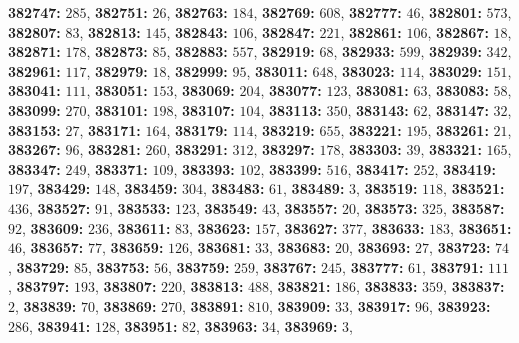 \textsf{\bfseries 382747:} $285$, \textsf{\bfseries 382751:} $26$, \textsf{\bfseries 382763:} $184$, \textsf{\bfseries 382769:} $608$, \textsf{\bfseries 382777:} $46$, \textsf{\bfseries 382801:} $573$, \textsf{\bfseries 382807:} $83$, \textsf{\bfseries 382813:} $145$, \textsf{\bfseries 382843:} $106$, \textsf{\bfseries 382847:} $221$, \textsf{\bfseries 382861:} $106$, \textsf{\bfseries 382867:} $18$, \textsf{\bfseries 382871:} $178$, \textsf{\bfseries 382873:} $85$, \textsf{\bfseries 382883:} $557$, \textsf{\bfseries 382919:} $68$, \textsf{\bfseries 382933:} $599$, \textsf{\bfseries 382939:} $342$, \textsf{\bfseries 382961:} $117$, \textsf{\bfseries 382979:} $18$, \textsf{\bfseries 382999:} $95$, \textsf{\bfseries 383011:} $648$, \textsf{\bfseries 383023:} $114$, \textsf{\bfseries 383029:} $151$, \textsf{\bfseries 383041:} $111$, \textsf{\bfseries 383051:} $153$, \textsf{\bfseries 383069:} $204$, \textsf{\bfseries 383077:} $123$, \textsf{\bfseries 383081:} $63$, \textsf{\bfseries 383083:} $58$, \textsf{\bfseries 383099:} $270$, \textsf{\bfseries 383101:} $198$, \textsf{\bfseries 383107:} $104$, \textsf{\bfseries 383113:} $350$, \textsf{\bfseries 383143:} $62$, \textsf{\bfseries 383147:} $32$, \textsf{\bfseries 383153:} $27$, \textsf{\bfseries 383171:} $164$, \textsf{\bfseries 383179:} $114$, \textsf{\bfseries 383219:} $655$, \textsf{\bfseries 383221:} $195$, \textsf{\bfseries 383261:} $21$, \textsf{\bfseries 383267:} $96$, \textsf{\bfseries 383281:} $260$, \textsf{\bfseries 383291:} $312$, \textsf{\bfseries 383297:} $178$, \textsf{\bfseries 383303:} $39$, \textsf{\bfseries 383321:} $165$, \textsf{\bfseries 383347:} $249$, \textsf{\bfseries 383371:} $109$, \textsf{\bfseries 383393:} $102$, \textsf{\bfseries 383399:} $516$, \textsf{\bfseries 383417:} $252$, \textsf{\bfseries 383419:} $197$, \textsf{\bfseries 383429:} $148$, \textsf{\bfseries 383459:} $304$, \textsf{\bfseries 383483:} $61$, \textsf{\bfseries 383489:} $3$, \textsf{\bfseries 383519:} $118$, \textsf{\bfseries 383521:} $436$, \textsf{\bfseries 383527:} $91$, \textsf{\bfseries 383533:} $123$, \textsf{\bfseries 383549:} $43$, \textsf{\bfseries 383557:} $20$, \textsf{\bfseries 383573:} $325$, \textsf{\bfseries 383587:} $92$, \textsf{\bfseries 383609:} $236$, \textsf{\bfseries 383611:} $83$, \textsf{\bfseries 383623:} $157$, \textsf{\bfseries 383627:} $377$, \textsf{\bfseries 383633:} $183$, \textsf{\bfseries 383651:} $46$, \textsf{\bfseries 383657:} $77$, \textsf{\bfseries 383659:} $126$, \textsf{\bfseries 383681:} $33$, \textsf{\bfseries 383683:} $20$, \textsf{\bfseries 383693:} $27$, \textsf{\bfseries 383723:} $74$, \textsf{\bfseries 383729:} $85$, \textsf{\bfseries 383753:} $56$, \textsf{\bfseries 383759:} $259$, \textsf{\bfseries 383767:} $245$, \textsf{\bfseries 383777:} $61$, \textsf{\bfseries 383791:} $111$, \textsf{\bfseries 383797:} $193$, \textsf{\bfseries 383807:} $220$, \textsf{\bfseries 383813:} $488$, \textsf{\bfseries 383821:} $186$, \textsf{\bfseries 383833:} $359$, \textsf{\bfseries 383837:} $2$, \textsf{\bfseries 383839:} $70$, \textsf{\bfseries 383869:} $270$, \textsf{\bfseries 383891:} $810$, \textsf{\bfseries 383909:} $33$, \textsf{\bfseries 383917:} $96$, \textsf{\bfseries 383923:} $286$, \textsf{\bfseries 383941:} $128$, \textsf{\bfseries 383951:} $82$, \textsf{\bfseries 383963:} $34$, \textsf{\bfseries 383969:} $3$, 
